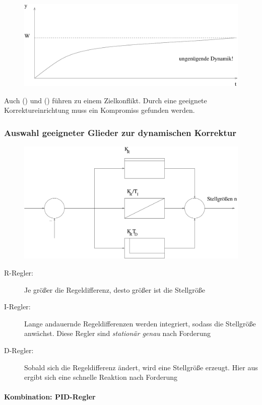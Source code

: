 \message{ !name(Mitschrieb_SysRegel.tex)}\documentclass[12pt,a4paper,ngerman]{scrartcl}
\newcommand{\RM}[1]{\MakeUppercase{\romannumeral #1{.}}}
\begin{document}
\begin{itemize}
\begin{figure}[H]
    \centering
    \includegraphics[width=.7\linewidth]{sysregel_No_4}
  \end{figure}

\end{itemize}
Auch (\RM{3}) und (\RM{4}) führen zu einem Zielkonflikt. Durch eine geeignete Korrektureinrichtung muss ein Kompromiss gefunden werden.

\subsubsection{Auswahl geeigneter Glieder zur dynamischen Korrektur}
\begin{figure}[H]
  \centering
  \includegraphics[width=.7\linewidth]{sysregel_No_2}
\end{figure}


\begin{description}
\item[R-Regler:] Je größer die Regeldifferenz, desto größer ist die Stellgröße
\item[I-Regler:] Lange andauernde Regeldifferenzen werden integriert, sodass die Stellgröße anwächst. Diese Regler sind \emph{stationär genau} nach Forderung \RM{2}
\item[D-Regler:] Sobald sich die Regeldifferenz ändert, wird eine Stellgröße erzeugt. Hier aus ergibt sich eine schnelle Reaktion nach Forderung \RM{4} 
\end{description}

\paragraph{Kombination: PID-Regler}
\end{document}
